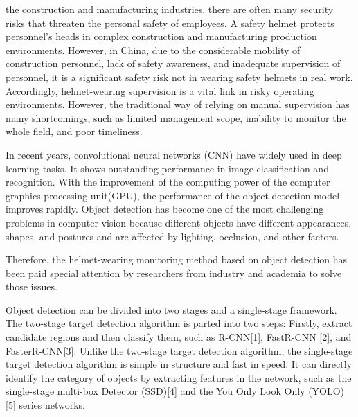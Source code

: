 \documentclass[journal]{IEEEtran}
\begin{document}
 the construction and manufacturing industries, there are often many security risks that threaten the personal safety of employees. A safety helmet protects personnel's heads in complex construction and manufacturing production environments. However, in China, due to the considerable mobility of construction personnel, lack of safety awareness, and inadequate supervision of personnel, it is a significant safety risk not in wearing safety helmets in real work.
Accordingly, helmet-wearing supervision is a vital link in risky operating environments. However, the traditional way of relying on manual supervision has many shortcomings, such as limited management scope, inability to monitor the whole field, and poor timeliness.

In recent years, convolutional neural networks (CNN) have widely used in deep learning tasks. It shows outstanding performance in image classification and recognition.
With the improvement of the computing power of the computer graphics processing unit(GPU), the performance of the object detection model improves rapidly. Object detection has become one of the most challenging problems in computer vision because different objects have different appearances, shapes, and postures and are affected by lighting, occlusion, and other factors.

Therefore, the helmet-wearing monitoring method based on object detection has been paid special attention by researchers from industry and academia to solve those issues.

Object detection can be divided into two stages and a single-stage framework. The two-stage target detection algorithm is parted into two steps: Firstly, extract candidate regions and then classify them, such as R-CNN[1], FastR-CNN [2], and FasterR-CNN[3]. Unlike the two-stage target detection algorithm, the single-stage target detection algorithm is simple in structure and fast in speed. It can directly identify the category of objects by extracting features in the network, such as the single-stage multi-box Detector (SSD)[4]  and the You Only Look Only (YOLO) [5] series networks. 
\end{document}
